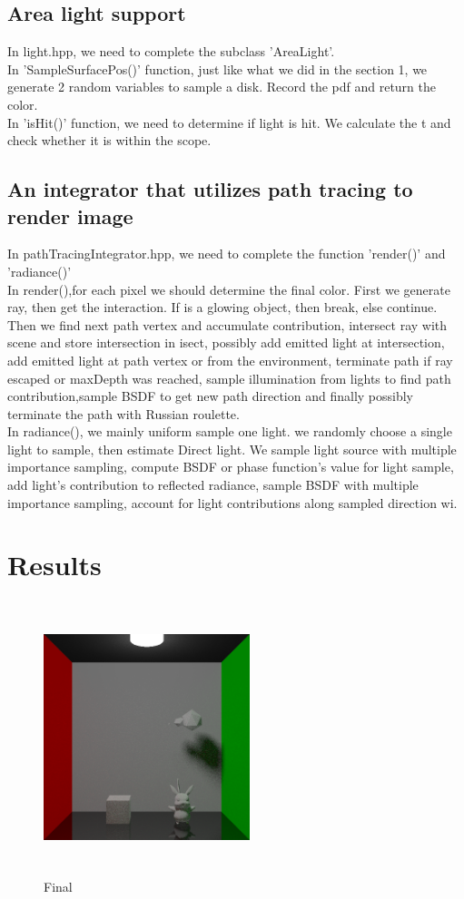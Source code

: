 \documentclass[acmtog]{acmart}
\begin{document}
\vspace*{1 ex}
\subsection{Area light support}
In light.hpp, we need to complete the subclass 'AreaLight'.
\\In 'SampleSurfacePos()' function, just like what we did in the section 1, we generate 2 random variables to sample a disk. Record the pdf and return the color. 
\\In 'isHit()' function, we need to determine if light is hit. We calculate the t and check whether it is within the scope.
\vspace*{1 ex}

\subsection{An integrator that utilizes path tracing to render image}
In pathTracingIntegrator.hpp, we need to complete the function 'render()' and 'radiance()'
\\In render(),for each pixel we should determine the final color. First we generate ray, then get the interaction. If is a glowing object, then break, else continue. Then we find next path vertex and accumulate contribution, intersect ray with scene and store intersection in isect, possibly add emitted light at intersection, add emitted light at path vertex or from the environment, terminate path if ray escaped or maxDepth was reached, sample illumination from lights to find path contribution,sample BSDF to get new path direction and finally possibly terminate the path with Russian roulette.
\\In radiance(), we mainly uniform sample one light. we randomly choose a single light to sample, then estimate Direct light. We sample light source with multiple importance sampling, compute BSDF or phase function’s value for light sample, add light’s contribution to reflected radiance, sample BSDF with multiple importance sampling, account for light contributions along sampled direction wi.

\vspace*{2 ex}

\section{Results}

\begin{figure}[h]
\centering
\includegraphics[width=6cm,height=8cm]{final.png}
\caption{Final}
\end{figure}
\end{document}
